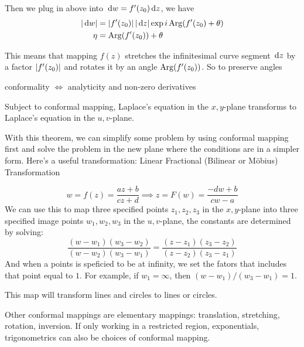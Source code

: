 \documentclass{article}
\begin{document}
Then we plug in above into \(\,\mathrm{d} w = f'(z_0)\,\mathrm{d} z\), we have
\begin{align*}
    \left\vert\,\mathrm{d} w\right\vert &= \left\vert f'(z_0)\right\vert\left\vert\,\mathrm{d} z\right\vert \exp{i\operatorname*{Arg}(f'(z_0)+\theta)}\\
    \eta &= \operatorname*{Arg}(f'(z_0))+\theta
\end{align*}

This means that mapping \(f(z)\) stretches the infinitesimal curve segment \(\,\mathrm{d} z\) by a factor \(\left\vert f'(z_0)\right\vert\) and rotates it by an angle \(\operatorname*{Arg}(f'(z_0))\). So to preserve angles



\begin{remark}
    conformality \(\iff\) analyticity and non-zero derivatives
\end{remark}

\begin{theorem}
    Subject to conformal mapping, Laplace's equation in the \(x,y\)-plane transforms to Laplace's equation in the \(u,v\)-plane.
\end{theorem}

With this theorem, we can simplify some problem by using conformal mapping first and solve the problem in the new plane where the conditions are in a simpler form. Here's a useful transformation: Linear Fractional (Bilinear or M\"obius) Transformation

\[w=f(z) = \frac{az+b}{cz+d}\implies z=F(w)=\frac{-dw+b}{cw-a}\]
We can use this to map three specified points \(z_1,z_2,z_3\) in the \(x,y\)-plane into three specified image points \(w_1,w_2,w_3\) in the \(u,v\)-plane, the constants are determined by solving:
\[\frac{(w-w_1)(w_3-w_2)}{(w-w_2)(w_3-w_1)}=\frac{(z-z_1)(z_3-z_2)}{(z-z_2)(z_3-z_1)}\]
And when a points is speficied to be at infinity, we set the fators that includes that point equal to \(1\). For example, if \(w_1=\infty\), then \((w-w_1)/(w_3-w_1)=1\).

This map will transform lines and circles to lines or circles.

Other conformal mappings are elementary mappings: translation, stretching, rotation, inversion. If only working in a restricted region, exponentials, trigonometrics can also be choices of conformal mapping. 
\end{document}
